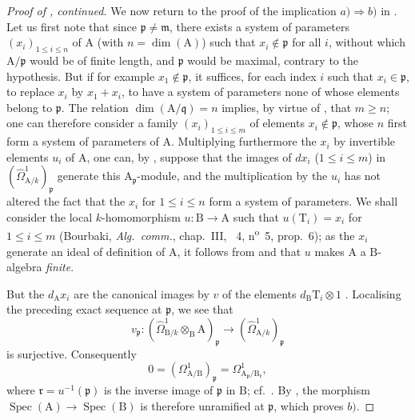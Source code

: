 \begin{proof}[Proof of {}, continued]
We now return to the proof of the implication $a)\Rightarrow b)$ in .
Let us first note that since $\mathfrak{p}\neq\mathfrak{m}$, there exists a system of parameters $(x_i)_{1\leq i\leq n}$ of $\mathrm{A}$ (with $n=\dim(\mathrm{A})$) such that $x_i\notin\mathfrak{p}$ for all $i$, without which $\mathrm{A}/\mathfrak{p}$ would be of finite length, and $\mathfrak{p}$ would be maximal, contrary to the hypothesis.
But if for example $x_1\notin\mathfrak{p}$, it suffices, for each index $i$ such that $x_i\in\mathfrak{p}$, to replace $x_i$ by $x_1+x_i$, to have a system of parameters none of whose elements belong to $\mathfrak{p}$.
The relation $\dim(\mathrm{A}/\mathfrak{q})=n$ implies, by virtue of , that $m\geq n$; one can therefore consider a family $(x_i)_{1\leq i\leq m}$ of elements $x_i\notin\mathfrak{p}$, whose $n$ first form a system of parameters of $\mathrm{A}$.
Multiplying furthermore the $x_i$ by invertible elements $u_i$ of $\mathrm{A}$, one can, by , suppose that the images of $dx_i$ ($1\leq i\leq m$) in $(\hat{\Omega}^1_{\mathrm{A}/k})_\mathfrak{p}$ generate this $\mathrm{A}_\mathfrak{p}$-module, and the multiplication by the $u_i$ has not altered the fact that the $x_i$ for $1\leq i\leq n$ form a system of parameters.
We shall consider the local $k$-homomorphism $u:\mathrm{B}\to\mathrm{A}$ such that $u(\mathrm{T}_i)=x_i$ for $1\leq i\leq m$ (Bourbaki, \emph{Alg.\ comm.}, chap.~III, \textsection~4, n\textsuperscript{o}~5, prop.~6); as the $x_i$ generate an ideal of definition of $\mathrm{A}$, it follows from  and  that $u$ makes $\mathrm{A}$ a $\mathrm{B}$-algebra \emph{finite}.

But the $d_\mathrm{A}x_i$ are the canonical images by $v$ of the elements $d_\mathrm{B}\mathrm{T}_i\otimes 1$ .
Localising the preceding exact sequence at $\mathfrak p$, we see that
\[
  v_\mathfrak p:(\hat{\Omega}^1_{\mathrm{B}/k}\otimes_\mathrm{B}\mathrm{A})_\mathfrak p
  \longrightarrow(\hat{\Omega}^1_{\mathrm{A}/k})_\mathfrak p
\]
is surjective. Consequently
\[
  0=(\Omega^1_{\mathrm{A}/\mathrm{B}})_\mathfrak p
   =\Omega^1_{\mathrm{A}_\mathfrak p/\mathrm{B}_\mathfrak r},
\]
where $\mathfrak r=u^{-1}(\mathfrak p)$ is the inverse image of $\mathfrak p$ in $\mathrm{B}$; cf.\ . By , the morphism $\operatorname{Spec}(\mathrm{A})\to\operatorname{Spec}(\mathrm{B})$ is therefore unramified at $\mathfrak p$, which proves $b)$.
\end{proof}

